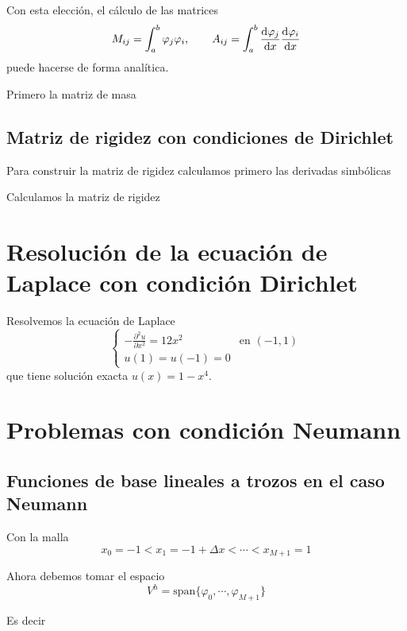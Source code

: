 Con esta elección, el cálculo de las matrices \[
    M_{ij} = \int_a^b \varphi_j \varphi_i , \qquad A_{ij} =  \int_a^b \frac{\mathrm{d} \varphi_j}{\mathrm{d} x}  \frac{\mathrm{d} \varphi_i}{\mathrm{d} x}
\] puede hacerse de forma analítica.



Primero la matriz de masa

\subsection{Matriz de rigidez con condiciones de
    Dirichlet}\label{matriz-de-rigidez-con-condiciones-de-dirichlet}

Para construir la matriz de rigidez calculamos primero las derivadas
simbólicas


Calculamos la matriz de rigidez


\section{Resolución de la ecuación de Laplace con condición
  Dirichlet}\label{resoluciuxf3n-de-la-ecuaciuxf3n-de-laplace-con-condiciuxf3n-dirichlet}

Resolvemos la ecuación de Laplace \[
    \begin{cases}
        -\frac{\partial^2 u}{\partial x^2} = 12 x^2 & \text{en } (-1,1) \\
        u(1) = u(-1) = 0
    \end{cases}
\] que tiene solución exacta \(u(x) = 1-x^4\).


\section{Problemas con condición
  Neumann}\label{problemas-con-condiciuxf3n-neumann}

\subsection{Funciones de base lineales a trozos en el caso
    Neumann}\label{funciones-de-base-lineales-a-trozos-en-el-caso-neumannscrollable}

Con la malla \[
    x_0 = -1 < x_1 = -1+\Delta x < \cdots < x_{M+1} = 1
\]



Ahora debemos tomar el espacio \[
    V^h = \mathrm{span} \{ \varphi_0, \cdots, \varphi_{M+1}   \}
\]



Es decir


